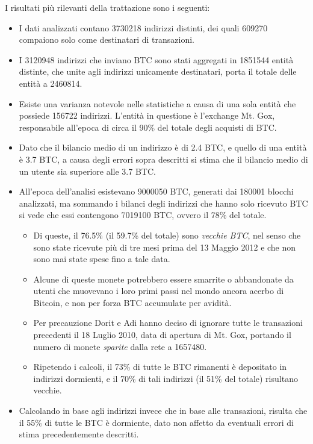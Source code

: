 I risultati più rilevanti della trattazione sono i seguenti:
\begin{itemize}
    \item I dati analizzati contano 3730218 indirizzi distinti, dei quali 609270 compaiono solo come destinatari di transazioni.
    \item I 3120948 indirizzi che inviano BTC sono stati aggregati in 1851544 entità distinte, che unite agli indirizzi unicamente destinatari, porta il totale delle entità a 2460814.
    \item Esiste una varianza notevole nelle statistiche a causa di una sola entità che possiede 156722 indirizzi. L'entità in questione è l'exchange Mt. Gox, responsabile all'epoca di circa il 90\% del totale degli acquisti di BTC.
    \item Dato che il bilancio medio di un indirizzo è di 2.4 BTC, e quello di una entità è 3.7 BTC, a causa degli errori sopra descritti si stima che il bilancio medio di un utente sia superiore alle 3.7 BTC.
    \item All'epoca dell'analisi esistevano 9000050 BTC, generati dai 180001 blocchi analizzati, ma sommando i bilanci degli indirizzi che hanno solo ricevuto BTC si vede che essi contengono 7019100 BTC, ovvero il 78\% del totale.
      \begin{itemize}
          \item Di queste, il 76.5\% (il 59.7\% del totale) sono \emph{vecchie BTC}, nel senso che sono state ricevute più di tre mesi prima del 13 Maggio 2012 e che non sono mai state spese fino a tale data.
          \item Alcune di queste monete potrebbero essere smarrite o abbandonate da utenti che muovevano i loro primi passi nel mondo ancora acerbo di Bitcoin, e non per forza BTC accumulate per avidità.
          \item Per precauzione Dorit e Adi hanno deciso di ignorare tutte le transazioni precedenti il 18 Luglio 2010, data di apertura di Mt. Gox, portando il numero di monete \emph{sparite} dalla rete a 1657480.
          \item Ripetendo i calcoli, il 73\% di tutte le BTC rimanenti è depositato in indirizzi dormienti, e il 70\% di tali indirizzi (il 51\% del totale) risultano vecchie.
      \end{itemize}
    \item Calcolando in base agli indirizzi invece che in base alle transazioni, risulta che il 55\% di tutte le BTC è dormiente, dato non affetto da eventuali errori di stima precedentemente descritti.

\end{itemize}
